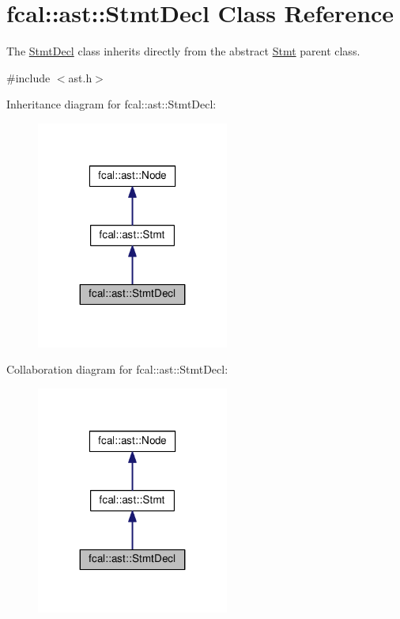 \hypertarget{classfcal_1_1ast_1_1StmtDecl}{}\section{fcal\+:\+:ast\+:\+:Stmt\+Decl Class Reference}
\label{classfcal_1_1ast_1_1StmtDecl}


The \hyperlink{classfcal_1_1ast_1_1StmtDecl}{Stmt\+Decl} class inherits directly from the abstract \hyperlink{classfcal_1_1ast_1_1Stmt}{Stmt} parent class.  




{\ttfamily \#include $<$ast.\+h$>$}



Inheritance diagram for fcal\+:\+:ast\+:\+:Stmt\+Decl\+:
\nopagebreak
\begin{figure}[H]
\begin{center}
\leavevmode
\includegraphics[width=179pt]{classfcal_1_1ast_1_1StmtDecl__inherit__graph}
\end{center}
\end{figure}


Collaboration diagram for fcal\+:\+:ast\+:\+:Stmt\+Decl\+:
\nopagebreak
\begin{figure}[H]
\begin{center}
\leavevmode
\includegraphics[width=179pt]{classfcal_1_1ast_1_1StmtDecl__coll__graph}
\end{center}
\end{figure}

